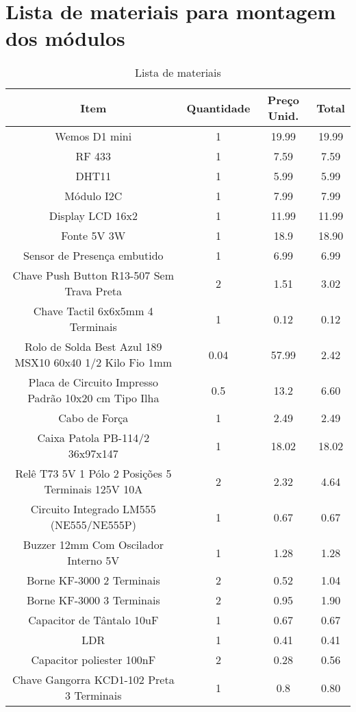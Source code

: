 \chapter{Lista de materiais para montagem dos módulos}
\label{listamateriais}

\begin{table}[hbp]
	\caption{Lista de materiais}
	\setlength\tabcolsep{1.5pt}
	\centering
	\footnotesize
	\begin{tabular}{cccc}
		\toprule
		\textbf{Item} & \textbf{Quantidade} & \textbf{Preço Unid.} & \textbf{Total} \\
		\midrule
		Wemos D1 mini & 1 & 19.99 & 19.99 \\
		RF 433 & 1 & 7.59 & 7.59 \\
		DHT11 & 1 & 5.99 & 5.99 \\
		Módulo I2C & 1 & 7.99 & 7.99 \\
		Display LCD 16x2 & 1 & 11.99 & 11.99 \\
		Fonte 5V 3W & 1 & 18.9 & 18.90 \\
		Sensor de Presença embutido & 1 & 6.99 & 6.99 \\
		Chave Push Button R13-507 Sem Trava Preta & 2 & 1.51 & 3.02 \\
		Chave Tactil 6x6x5mm 4 Terminais & 1 & 0.12 & 0.12 \\
		Rolo de Solda Best Azul 189 MSX10 60x40 1/2 Kilo Fio 1mm & 0.04 & 57.99 & 2.42 \\
		Placa de Circuito Impresso Padrão 10x20 cm Tipo Ilha & 0.5 & 13.2 & 6.60 \\
		Cabo de Força & 1 & 2.49 & 2.49 \\
		Caixa Patola PB-114/2 36x97x147 & 1 & 18.02 & 18.02 \\
		Relê T73 5V 1 Pólo 2 Posições 5 Terminais 125V 10A & 2 & 2.32 & 4.64 \\
		Circuito Integrado LM555 (NE555/NE555P) & 1 & 0.67 & 0.67 \\
		Buzzer 12mm Com Oscilador Interno 5V & 1 & 1.28 & 1.28 \\
		Borne KF-3000 2 Terminais & 2 & 0.52 & 1.04 \\
		Borne KF-3000 3 Terminais & 2 & 0.95 & 1.90 \\
		Capacitor de Tântalo 10uF & 1 & 0.67 & 0.67 \\
		LDR & 1 & 0.41 & 0.41 \\
		Capacitor poliester 100nF & 2 & 0.28 & 0.56 \\
		Chave Gangorra KCD1-102 Preta 3 Terminais & 1 & 0.8 & 0.80 \\

\end{tabular}
\end{table}
